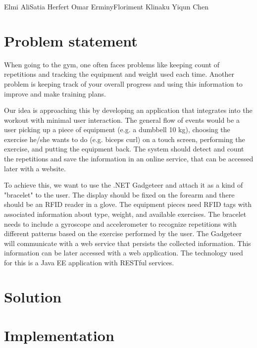 \documentclass{tk3-team}
\begin{document}
%
                {Elmi Ali}{Satia Herfert}%
                {Omar Erminy}{Floriment Klinaku}%
                {Yiqun Chen}%

\section{Problem statement}

When going to the gym, one often faces problems like keeping count of repetitions and tracking the equipment and weight used each time. Another problem is keeping track of your overall progress and using this information to improve and make training plans.

Our idea is approaching this by developing an application that integrates into the workout with minimal user interaction. The general flow of events would be a user picking up a piece of equipment (e.g. a dumbbell 10 kg), choosing the exercise he/she wants to do (e.g. biceps curl) on a touch screen, performing the exercise, and putting the equipment back. The system should detect and count the repetitions and save the information in an online service, that can be accessed later with a website.

To achieve this, we want to use the .NET Gadgeteer and attach it as a kind of "bracelet" to the user. The display should be fixed on the forearm and there should be an RFID reader in a glove. The equipment pieces need RFID tags with associated information about type, weight, and available exercises. The bracelet needs to include a gyroscope and accelerometer to recognize repetitions with different patterns based on the exercise performed by the user. The Gadgeteer will communicate with a web service that persists the collected information. This information can be later accessed with a web application. The technology used for this is a Java EE application with RESTful services.

\section{Solution}

\section{Implementation}
\end{document}
